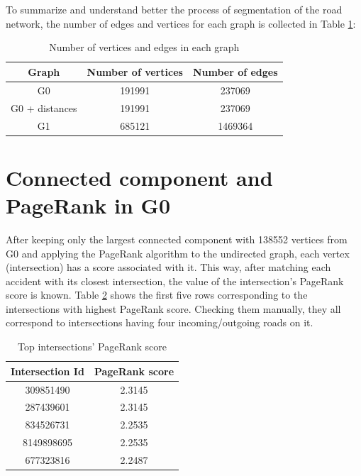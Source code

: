 \\
\\
To summarize and understand better the process of segmentation of the road network, the number of edges and vertices for each graph is collected in Table \ref{tab:graphs}:
\begin{table}[H]
\centering
\begin{tabular}{|c|c|c|}
\hline
\textbf{Graph}         & \textbf{Number of vertices} & \textbf{Number of edges} \\ \hline
G0                &                      191991 &           237069     \\ \hline
G0 + distances    &                      191991 &           237069 \\ \hline
G1                &                      685121     &      1469364   \\ \hline
\end{tabular}
\captionsetup{justification=centering}
\caption{Number of vertices and edges in each graph}
\label{tab:graphs}
\end{table}

\section{Connected component and PageRank in G0}
After keeping only the largest connected component with 138552 vertices from G0 and applying the PageRank algorithm to the undirected graph, each vertex (intersection) has a score associated with it. This way, after matching each accident with its closest intersection, the value of the intersection's PageRank score is known. Table \ref{tab:pagerank} shows the first five rows corresponding to the intersections with highest PageRank score. Checking them manually, they all correspond to intersections having four incoming/outgoing roads on it.
\begin{table}[H]
\centering
\begin{tabular}{|c|c|}
\hline
\textbf{Intersection Id}         & \textbf{PageRank score}  \\ \hline
309851490                &                      2.3145  \\ \hline
287439601                &                      2.3145  \\ \hline
834526731                &                      2.2535  \\ \hline
8149898695                &                      2.2535  \\ \hline
677323816                &                      2.2487  \\ \hline
\end{tabular}
\captionsetup{justification=centering}
\caption{Top intersections' PageRank score}
\label{tab:pagerank}
\end{table}


